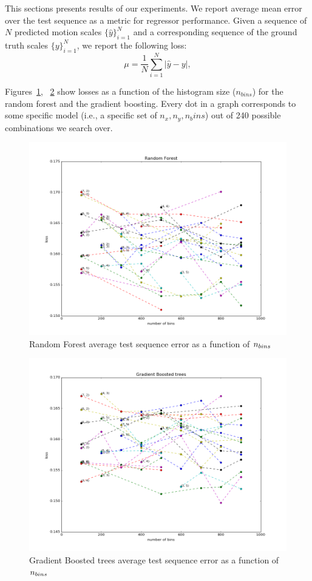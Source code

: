 \documentclass[twoside]{article}
\begin{document}
This sections presents results of our experiments.  We report average
mean error over the test sequence as a metric for regressor
performance.  Given a sequence of $N$ predicted motion scales
$\{\hat{y}\}_{i=1}^N$ and a corresponding sequence of the ground truth
scales $\{y\}_{i=1}^N$, we report the following loss:
\begin{equation}
  \mu = \frac{1}{N}\sum_{i=1}^N |\hat{y} - y|,
\end{equation}

Figures~\ref{fig:rf_loss_over_bins}, ~\ref{fig:xgb_loss_over_bins}
show losses as a function of the histogram size ($n_{bins}$) for the
random forest and the gradient boosting.  Every dot in a graph
corresponds to some specific model (i.e., a specific set of
$n_x, n_y, n_bins$) out of 240 possible combinations we search over.
\begin{figure}[!ht]
  \centering
  \includegraphics[width=0.6\linewidth]{rf_loss_over_bins}
  \caption{Random Forest average test sequence error as a function of $\protect n_{bins}$ }
  \label{fig:rf_loss_over_bins}
\end{figure}

\begin{figure}[!ht]
  \centering  
  \includegraphics[width=0.6\linewidth]{xgb_loss_over_bins}
  \caption{Gradient Boosted trees average test sequence error as a function of $\protect n_{bins}$}
  \label{fig:xgb_loss_over_bins}
\end{figure}
\end{document}
